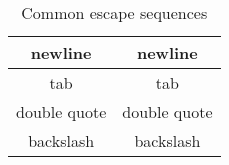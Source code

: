 \begin{table}[!ht]
\begin{center}
\begin{tabular}{|c|c|}
\hline
newline & newline \\
\hline
tab & tab \\
\hline
double quote & double quote \\
\hline
backslash & backslash \\
\hline
\end{tabular}
\caption{Common escape sequences}
\label{tab:escape}
\end{center}
\end{table}
